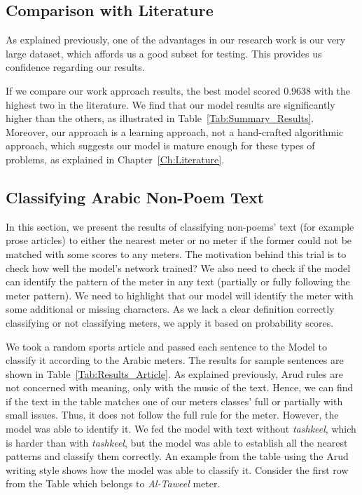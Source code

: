 \subsection{Comparison with Literature}
As explained previously, one of the advantages in our research work is our very large dataset, which affords us a good subset for testing. This provides us confidence regarding our results.

If we compare our work approach results, the best model scored 0.9638 with the highest two in the literature. We find that our model results are significantly higher than the others, as illustrated in Table~\ref{Tab:Summary_Results}. Moreover, our approach is a learning approach, not a hand-crafted algorithmic approach, which suggests our model is mature enough for these types of problems, as explained in Chapter~\ref{Ch:Literature}.


\subsection{Classifying Arabic Non-Poem Text}

In this section, we present the results of classifying non-poems’ text (for example prose articles) to either the nearest meter or no meter if the former could not be matched with some scores to any meters. The motivation behind this trial is to check how well the model’s network trained? We also need to check if the model can identify the pattern of the meter in any text (partially or fully following the meter pattern). We need to highlight that our model will identify the meter with some additional or missing characters. As we lack a clear definition correctly classifying or not classifying meters, we apply it based on probability scores.

We took a random sports article and passed each sentence to the Model to classify it according to the Arabic meters. The results for sample sentences are shown in Table~\ref{Tab:Results_Article}. As explained previously, Arud rules are not concerned with meaning, only with the music of the text. Hence, we can find if the text in the table matches one of our meters classes’ full or partially with small issues. Thus, it does not follow the full rule for the meter. However, the model was able to identify it. We fed the model with text without \textit{tashkeel}, which is harder than with \textit{tashkeel}, but the model was able to establish all the nearest patterns and classify them correctly. An example from the table using the Arud writing style shows how the model was able to classify it. Consider the first row from the Table which belongs to \textit{Al-Taweel} meter.


